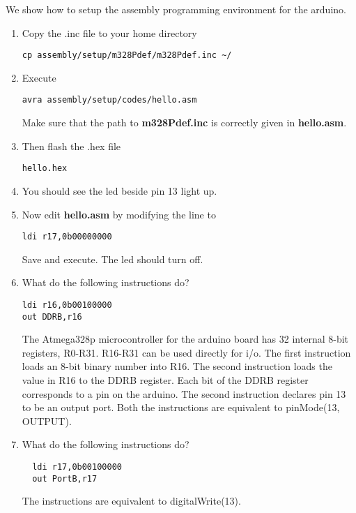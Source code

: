 We show how to setup the assembly programming
environment for the arduino.
%
\begin{enumerate}[label=\arabic*.,ref=\theenumi]
\item Copy the .inc file to your home directory
\begin{lstlisting}
cp assembly/setup/m328Pdef/m328Pdef.inc ~/
\end{lstlisting}
\item Execute
\begin{lstlisting}
avra assembly/setup/codes/hello.asm
\end{lstlisting}
		Make sure that the path to \textbf{m328Pdef.inc} is correctly given in \textbf{hello.asm}.
\item Then  flash the .hex file
\begin{lstlisting}
hello.hex
\end{lstlisting}
\item You should
see the led beside pin 13 light up.
\item Now edit \textbf{hello.asm} by modifying the line to
\begin{lstlisting}
ldi r17,0b00000000
\end{lstlisting}
Save and execute.  The led should turn off.
\item What do the following instructions do?
\begin{lstlisting}
ldi r16,0b00100000
out DDRB,r16
\end{lstlisting}
\solution The Atmega328p microcontroller for the arduino board has 32 internal 8-bit registers, R0-R31. R16-R31 can be used directly for i/o.  The first instruction loads an 8-bit binary number into  R16. The second instruction loads the value in R16 to the DDRB register.  Each bit of the DDRB register corresponds to a pin on the arduino. The second instruction declares pin 13 to be an output port. Both the instructions are equivalent to  pinMode(13, OUTPUT).  
\item What do the following instructions do?
\begin{lstlisting}
  ldi r17,0b00100000
  out PortB,r17
\end{lstlisting}
\solution The instructions are equivalent to digitalWrite(13).


\end{enumerate}



